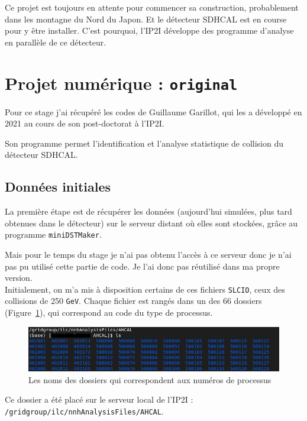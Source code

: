 \documentclass[10pt,a4paper]{report}
\newcommand{\SLCIO}{\texttt{SLCIO}\xspace}
\newcommand{\original}{\texttt{original}\xspace}
\newcommand{\minidstmarker}{\texttt{miniDSTMaker}\xspace}
\newcommand{\GeV}{\texttt{GeV}}
\begin{document}
Ce projet est toujours en attente pour commencer sa construction, probablement dans les montagne du Nord du Japon. Et le détecteur SDHCAL est en course pour y être installer. C'est pourquoi, l'IP2I développe des programme d'analyse en parallèle de ce détecteur.

\section{Projet numérique : \original}

Pour ce stage j'ai récupéré les codes de Guillaume Garillot, qui les a développé en 2021 au cours de son post-doctorat à l'IP2I. 

Son programme permet l'identification et l'analyse statistique de collision du détecteur SDHCAL.

\subsection{Données initiales}

La première étape est de récupérer les données (aujourd'hui simulées, plus tard obtenues dans le détecteur) sur le serveur distant où elles sont stockées, grâce au programme \minidstmarker. 

Mais pour le temps du stage je n'ai pas obtenu l'accès à ce serveur donc je n'ai pas pu utilisé cette partie de code. Je l'ai donc pas réutilisé dans ma propre version.\\

Initialement, on m'a mis à disposition certains de ces fichiers \SLCIO, ceux des collisions de 250 \GeV. 
Chaque fichier est rangés dans un des 66 dossiers (Figure~\ref{listeProcessus}), qui correspond au code du type de processus.

\begin{figure}[h!]
	\includegraphics[width=\textwidth]{../img/listeProcessus.png} 
	\caption{Les noms des dossiers qui correspondent aux numéros de processus}
	\label{listeProcessus}
\end{figure}

Ce dossier a été placé sur le serveur local de l'IP2I : \texttt{/gridgroup/ilc/nnhAnalysisFiles/AHCAL}.
\end{document}
